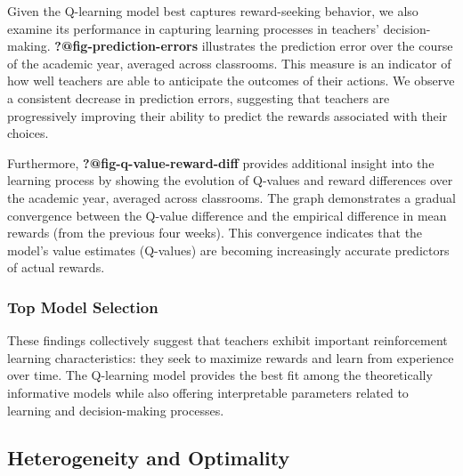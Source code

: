 \documentclass[
  number,
  preprint,
  3p,
  onecolumn]{elsarticle}
\begin{document}
Given the Q-learning model best captures reward-seeking behavior, we
also examine its performance in capturing learning processes in
teachers' decision-making. \textbf{?@fig-prediction-errors} illustrates
the prediction error over the course of the academic year, averaged
across classrooms. This measure is an indicator of how well teachers are
able to anticipate the outcomes of their actions. We observe a
consistent decrease in prediction errors, suggesting that teachers are
progressively improving their ability to predict the rewards associated
with their choices.

Furthermore, \textbf{?@fig-q-value-reward-diff} provides additional
insight into the learning process by showing the evolution of Q-values
and reward differences over the academic year, averaged across
classrooms. The graph demonstrates a gradual convergence between the
Q-value difference and the empirical difference in mean rewards (from
the previous four weeks). This convergence indicates that the model's
value estimates (Q-values) are becoming increasingly accurate predictors
of actual rewards.

\subsubsection{Top Model Selection}\label{top-model-selection}

These findings collectively suggest that teachers exhibit important
reinforcement learning characteristics: they seek to maximize rewards
and learn from experience over time. The Q-learning model provides the
best fit among the theoretically informative models while also offering
interpretable parameters related to learning and decision-making
processes.

\subsection{Heterogeneity and
Optimality}\label{heterogeneity-and-optimality}
\end{document}
